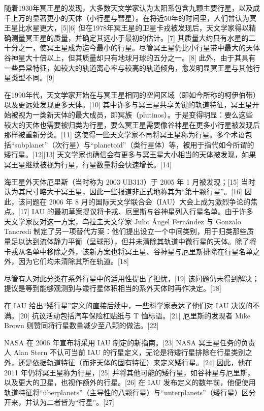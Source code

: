 随着1930年冥王星的发现，大多数天文学家认为太阳系包含九颗主要行星，以及成千上万的显著更小的天体（小行星与彗星）。在将近50年的时间里，人们曾认为冥王星比水星更大，[5][6] 但在1978年冥王星的卫星卡戎被发现后，天文学家得以精确测量冥王星的质量，并确定其远小于最初的估计。[7] 其质量大约只有水星的二十分之一，使冥王星成为迄今最小的行星。尽管冥王星仍比小行星带中最大的天体谷神星大十倍以上，但其质量却只有地球月球的五分之一。[8] 此外，由于其具有一些异常特征，如较大的轨道离心率与较高的轨道倾角，愈发明显冥王星与其他行星类型不同。[9]

在1990年代，天文学家开始在与冥王星相同的空间区域（即如今所称的柯伊伯带）以及更远处发现更多天体。[10] 其中许多与冥王星共享关键的轨道特征，冥王星开始被视为一类新天体的最大成员，即冥族（plutinos）。于是变得明显：要么这些较大的天体也需要被归类为行星，要么冥王星需要像谷神星在更多小行星被发现后那样被重新分类。[11] 这使得一些天文学家不再将冥王星称为行星。多个术语包括“subplanet”（次行星）与“planetoid”（类行星体）等，被用于指代如今所谓的矮行星。[12][13] 天文学家也确信会有更多与冥王星大小相当的天体被发现，如果冥王星继续被视为行星，行星数量将会快速增长。[14]

海王星外天体厄里斯（当时称为 2003 UB313）于 2005 年 1 月被发现；[15] 当时认为其尺寸略大于冥王星，因此一些报道非正式地称其为“第十颗行星”。[16] 因此，该问题在 2006 年 8 月的国际天文学联合会（IAU）大会上成为激烈争论的焦点。[17] IAU 的最初草案提议将卡戎、厄里斯与谷神星列入行星名单。由于许多天文学家反对这一方案，乌拉圭天文学家 Julio Ángel Fernández 与 Gonzalo Tancredi 制定了另一项替代方案：他们提出设立一个中间类别，用于归类那些质量足以达到流体静力平衡（呈球形），但并未清除其轨道中微行星的天体。除了将卡戎从名单中移除之外，该新方案也将冥王星、谷神星与厄里斯排除在行星名单之外，因为它们均未清除其所在轨道。[18]

尽管有人对此分类在系外行星中的适用性提出了担忧，[19] 该问题仍未得到解决；提议是等到能够观测到与矮行星体积相当的系外天体时再作决定。[18]

在 IAU 给出“矮行星”定义的直接后续中，一些科学家表达了他们对 IAU 决议的不满。[20] 抗议活动包括汽车保险杠贴纸与 T 恤标语。[21] 厄里斯的发现者 Mike Brown 则赞同将行星数量减少至八颗的做法。[22]

NASA 在 2006 年宣布将采用 IAU 制定的新指南。[23] NASA 冥王星任务的负责人 Alan Stern 不认可当前 IAU 的行星定义，无论是将矮行星排除在行星类别之外，还是依据轨道特征（而非天体的固有特征）来定义矮行星。[24] 因此，他在 2011 年仍将冥王星称为行星，[25] 并将其他可能的矮行星，如谷神星与厄里斯，以及更大的卫星，也视作额外的行星。[26] 在 IAU 发布定义的数年前，他便使用轨道特征将“überplanets”（主导性的八颗行星）与“unterplanets”（矮行星）区分开来，并认为二者皆为“行星”。[27]

